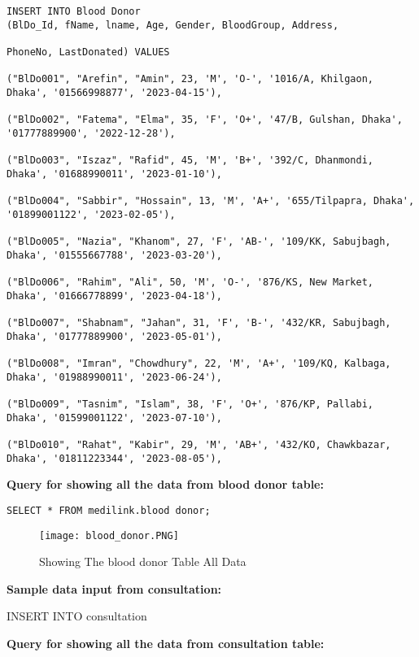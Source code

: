 \documentclass[11pt]{article}
\begin{document}
\begin{lstlisting}
INSERT INTO Blood Donor 
(BlDo_Id, fName, lname, Age, Gender, BloodGroup, Address, 

PhoneNo, LastDonated) VALUES

("BlDo001", "Arefin", "Amin", 23, 'M', 'O-', '1016/A, Khilgaon, Dhaka', '01566998877', '2023-04-15'),

("BlDo002", "Fatema", "Elma", 35, 'F', 'O+', '47/B, Gulshan, Dhaka', '01777889900', '2022-12-28'),

("BlDo003", "Iszaz", "Rafid", 45, 'M', 'B+', '392/C, Dhanmondi, Dhaka', '01688990011', '2023-01-10'),

("BlDo004", "Sabbir", "Hossain", 13, 'M', 'A+', '655/Tilpapra, Dhaka', '01899001122', '2023-02-05'),

("BlDo005", "Nazia", "Khanom", 27, 'F', 'AB-', '109/KK, Sabujbagh, Dhaka', '01555667788', '2023-03-20'),

("BlDo006", "Rahim", "Ali", 50, 'M', 'O-', '876/KS, New Market, Dhaka', '01666778899', '2023-04-18'),

("BlDo007", "Shabnam", "Jahan", 31, 'F', 'B-', '432/KR, Sabujbagh, Dhaka', '01777889900', '2023-05-01'),

("BlDo008", "Imran", "Chowdhury", 22, 'M', 'A+', '109/KQ, Kalbaga, Dhaka', '01988990011', '2023-06-24'),

("BlDo009", "Tasnim", "Islam", 38, 'F', 'O+', '876/KP, Pallabi, Dhaka', '01599001122', '2023-07-10'),

("BlDo010", "Rahat", "Kabir", 29, 'M', 'AB+', '432/KO, Chawkbazar, Dhaka', '01811223344', '2023-08-05'),

\end{lstlisting}

\textbf{Query for showing all the data from blood donor table: }
\begin{lstlisting}
SELECT * FROM medilink.blood donor;
\end{lstlisting}
\begin{figure}[H]
    \centering
    \texttt{[image: blood\_donor.PNG]}
    \caption{Showing The blood donor Table All Data}
    \label{fig:1}
\end{figure}



\textbf{Sample data input from consultation:}

INSERT INTO consultation 



\textbf{Query for showing all the data from consultation table: }
\end{document}
